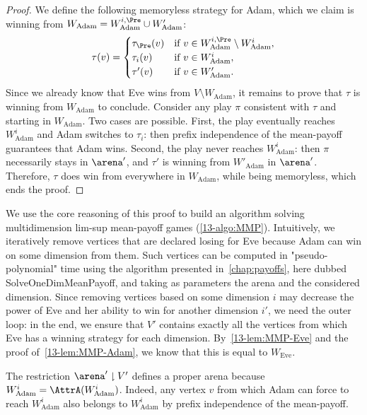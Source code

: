\begin{proof}

We define the following memoryless strategy for Adam, which we claim is winning from $W_{\text{Adam}} = W^{i, \Pre}_{\text{Adam}} \cup W'_{\text{Adam}}$:
\[
\tau(v) =
\begin{cases}
\tau_\Pre(v) &\text{if } v \in W^{i, \Pre}_{\text{Adam}} \setminus W^{i}_{\text{Adam}},\\
\tau_i(v) &\text{if } v \in W^{i}_{\text{Adam}},\\
\tau'(v) &\text{if } v \in W'_{\text{Adam}}.
\end{cases}
\]
Since we already know that Eve wins from $V \setminus W_{\text{Adam}}$, it remains to prove that $\tau$ is winning from $W_{\text{Adam}}$ to conclude. Consider any play $\pi$ consistent with $\tau$ and starting in $W_{\text{Adam}}$. Two cases are possible. First, the play eventually reaches $W^{i}_{\text{Adam}}$ and Adam switches to $\tau_i$: then prefix independence of the mean-payoff guarantees that Adam wins. Second, the play never reaches $W^{i}_{\text{Adam}}$: then $\pi$ necessarily stays in $\arena'$, and $\tau'$ is winning from $W'_{\text{Adam}}$ in $\arena'$. Therefore, $\tau$ does win from everywhere in $W_{\text{Adam}}$, while being memoryless, which ends the proof.
\end{proof}

We use the core reasoning of this proof to build an algorithm solving multidimension lim-sup mean-payoff games (\cref{13-algo:MMP}). Intuitively, we iteratively remove vertices that are declared losing for Eve because Adam can win on some dimension from them. Such vertices can be computed in "pseudo-polynomial" time using the algorithm presented in~\cref{chap:payoffs},  here dubbed \textsf{SolveOneDimMeanPayoff}, and taking as parameters the arena and the considered dimension. Since removing vertices based on some dimension $i$ may decrease the power of Eve and her ability to win for another dimension $i'$, we need the outer loop: in the end, we ensure that $V'$ contains exactly all the vertices from which Eve has a winning strategy for each dimension. By~\cref{13-lem:MMP-Eve} and the proof of~\cref{13-lem:MMP-Adam}, we know that this is equal to $W_{\text{Eve}}$.

\begin{remark}
\label{13-rmk:properArena}
The restriction $\arena' \downharpoonright V'$ defines a proper arena because $W^i_{\text{Adam}} = \AttrA(W^i_{\text{Adam}})$. Indeed, any vertex $v$ from which Adam can force to reach $W^i_{\text{Adam}}$ also belongs to $W^i_{\text{Adam}}$ by prefix independence of the mean-payoff.
\end{remark}

